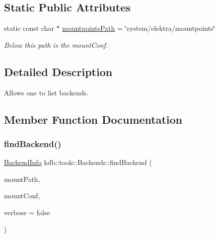 \subsection*{Static Public Attributes}
\begin{DoxyCompactItemize}
\item 
\mbox{\label{classkdb_1_1tools_1_1Backends_ac867850accaab4fda286f763cacc3926}} 
static const char $\ast$ \hyperlink{classkdb_1_1tools_1_1Backends_ac867850accaab4fda286f763cacc3926}{mountpoints\+Path} = \char`\"{}system/elektra/mountpoints\char`\"{}
\begin{DoxyCompactList}\small\item\em Below this path is the mount\+Conf. \end{DoxyCompactList}\end{DoxyCompactItemize}


\subsection{Detailed Description}
Allows one to list backends. 

\subsection{Member Function Documentation}
\mbox{\label{classkdb_1_1tools_1_1Backends_a692f3f6b5f01ed2e497a6e093e1e2e90}} 
\subsubsection{\texorpdfstring{find\+Backend()}{findBackend()}}
{\footnotesize\ttfamily \hyperlink{structkdb_1_1tools_1_1BackendInfo}{Backend\+Info} kdb\+::tools\+::\+Backends\+::find\+Backend (\begin{DoxyParamCaption}\item[{std\+::string const \&}]{mount\+Path,  }\item[{\hyperlink{classkdb_1_1KeySet}{Key\+Set}}]{mount\+Conf,  }\item[{bool}]{verbose = {\ttfamily false} }\end{DoxyParamCaption})\hspace{0.3cm}{\ttfamily [static]}}



